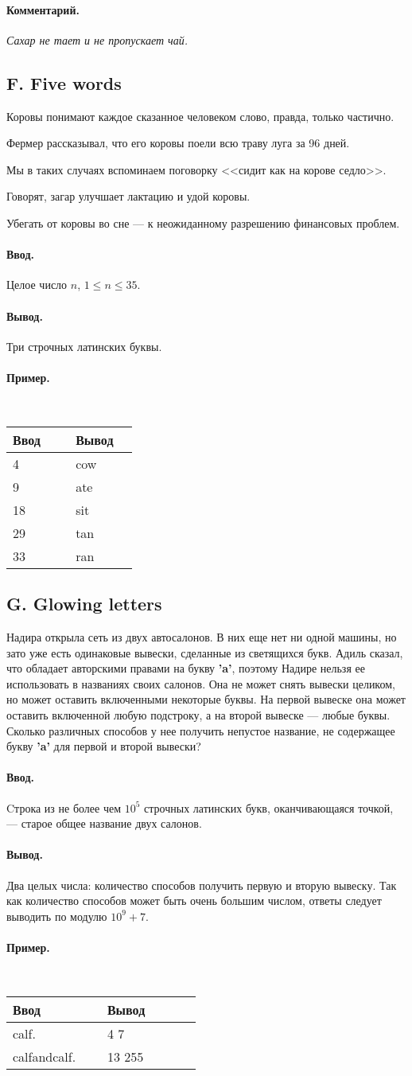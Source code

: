 \documentclass[12pt, a4paper]{article}
\newcommand{\informat}[1]
{
	\paragraph{Ввод.\\} #1
}
\newcommand{\outformat}[1]
{
	\paragraph{Вывод.\\} #1
}
\newcommand{\examplee}[4]
{
	\paragraph{Пример.\\}
	{\tt
	\begin{tabular}{|p{0.4\linewidth}|p{0.4\linewidth}|}
	\hline
	Ввод 	& Вывод  	\\
	\hline
	#1 		& #2 		\\
	\hline
	#3		& #4		\\
	\hline
	\end{tabular}
	}
}
\newcommand{\exampleeeee}[5]
{
	\paragraph{Пример.\\}
	{\tt
	\begin{tabular}{|p{0.4\linewidth}|p{0.4\linewidth}|}
	\hline
	Ввод 	& Вывод  	\\
	\hline
	#1		\\
	\hline
	#2		\\
	\hline
	#3		\\
	\hline
	#4		\\
	\hline
	#5		\\
	\hline
	\end{tabular}
	}
}
\newcommand{\excomm}[1]
{
	\paragraph{Комментарий. \\}
	\textit{#1}
}
\begin{document}
\excomm{Сахар не тает и не пропускает чай.}



\subsection*{F. Five words}

\noindent
Коровы понимают каждое сказанное человеком слово, правда, только частично.

\noindent
Фермер рассказывал, что его коровы поели всю траву луга за 96 дней.

\noindent
Мы в таких случаях вспоминаем поговорку <<сидит как на корове седло>>.

\noindent
Говорят, загар улучшает лактацию и удой коровы.

\noindent
Убегать от коровы во сне --- к неожиданному разрешению финансовых проблем.

\informat{Целое число $n$, $1 \le n \le 35$.}

\outformat{Три строчных латинских буквы.}

\exampleeeee{4 & cow}{9 & ate}{18 & sit}{29 & tan}{33 & ran}



\subsection*{G. Glowing letters}

Надира открыла сеть из двух автосалонов. В них еще нет ни одной машины, но зато уже есть одинаковые вывески, сделанные из светящихся букв. Адиль сказал, что обладает авторскими правами на букву \textbf{'a'}, поэтому Надире нельзя ее использовать в названиях своих салонов. Она не может снять вывески целиком, но может оставить включенными некоторые буквы. На первой вывеске она может оставить включенной любую подстроку, а на второй вывеске --- любые буквы. Сколько различных способов у нее получить непустое название, не содержащее букву \textbf{'a'} для первой и второй вывески?

\informat{Cтрока из не более чем $10^5$ строчных латинских букв, оканчивающаяся точкой, --- старое общее название двух салонов.}

\outformat{Два целых числа: количество способов получить первую и вторую вывеску. Так как количество способов может быть очень большим числом, ответы следует выводить по модулю $10^9 + 7$.}

\examplee{calf.}{4 7}{calfandcalf.}{13 255}
\end{document}
